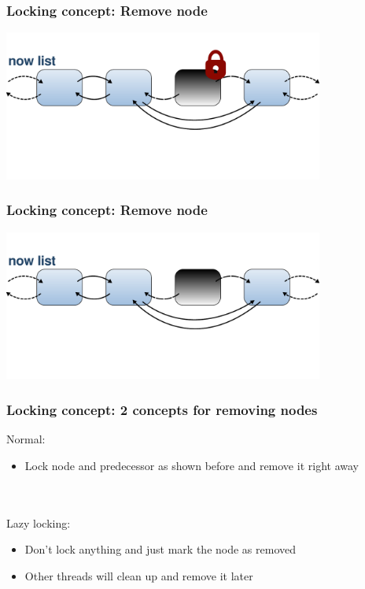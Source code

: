 \documentclass{beamer}
\begin{document}
\begin{frame}
\frametitle{Locking concept: Remove node}
\begin{center}
	\includegraphics[height=140pt]{remove6.pdf}
\end{center}
\end{frame}

\begin{frame}
\frametitle{Locking concept: Remove node}
\begin{center}
	\includegraphics[height=140pt]{remove7.pdf}
\end{center}
\end{frame}


\begin{frame}
\frametitle{Locking concept: 2 concepts for removing nodes}
Normal:
\begin{itemize}
\item Lock node and predecessor as shown before and remove it right away
\end{itemize}
\quad\\ \quad \\
Lazy locking:
\begin{itemize}
\item Don't lock anything and just mark the node as removed
\item Other threads will clean up and remove it later
\end{itemize}

\end{frame}
\end{document}
